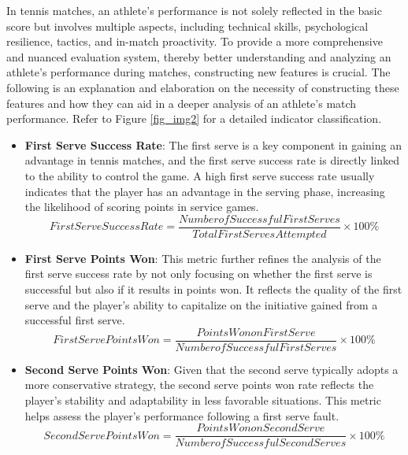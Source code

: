 \documentclass{mcmthesis}
\begin{document}
\qquad In tennis matches, an athlete's performance is not solely reflected in the basic score but involves multiple aspects, including technical skills, psychological resilience, tactics, and in-match proactivity. To provide a more comprehensive and nuanced evaluation system, thereby better understanding and analyzing an athlete's performance during matches, constructing new features is crucial. The following is an explanation and elaboration on the necessity of constructing these features and how they can aid in a deeper analysis of an athlete's match performance. Refer to Figure \ref{fig_img2} for a detailed indicator classification.
\begin{itemize}
    \item {\bf{First Serve Success Rate}}: The first serve is a key component in gaining an advantage in tennis matches, and the first serve success rate is directly linked to the ability to control the game. A high first serve success rate usually indicates that the player has an advantage in the serving phase, increasing the likelihood of scoring points in service games.
          \begin{equation} \label{eq1}
              First Serve Success Rate = \frac{Number of Successful First Serves}{Total First Serves Attempted} \times 100\%
          \end{equation}
    \item {\bf First Serve Points Won}: This metric further refines the analysis of the first serve success rate by not only focusing on whether the first serve is successful but also if it results in points won. It reflects the quality of the first serve and the player's ability to capitalize on the initiative gained from a successful first serve.
          \begin{equation} \label{eq1}
              First Serve Points Won = \frac{Points Won on First Serve}{Number of Successful First Serves} \times 100\%
          \end{equation}
    \item {\bf Second Serve Points Won}: Given that the second serve typically adopts a more conservative strategy, the second serve points won rate reflects the player's stability and adaptability in less favorable situations. This metric helps assess the player's performance following a first serve fault.
          \begin{equation} \label{eq1}
              Second Serve Points Won = \frac{Points Won on Second Serve}{Number of Successful Second Serves} \times 100\%

\end{equation}
\end{itemize}
\end{document}
